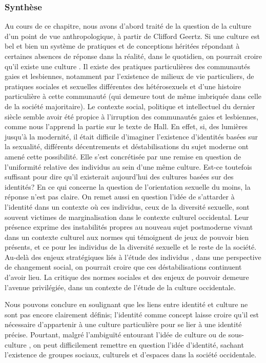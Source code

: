 \subsubsection{Synthèse}
\label{sec:synth_se}
Au cours de ce chapitre, nous avons d'abord traité de la question de la culture d'un point de vue anthropologique, à partir de Clifford Geertz.
Si une culture est bel et bien un système de pratiques et de conceptions héritées répondant à certaines absences de réponse dans la réalité, dans le quotidien, on pourrait croire qu'il existe une culture \lgbt{}.
Il existe des pratiques particulières des communautés gaies et lesbiennes, notamment par l'existence de milieux de vie particuliers, de pratiques sociales et sexuelles différentes des hétérosexuels et d'une histoire particulière à cette communauté (qui demeure tout de même imbriquée dans celle de la société majoritaire).
Le contexte social, politique et intellectuel du dernier siècle semble avoir été propice à l'irruption des communautés gaies et lesbiennes, comme nous l'apprend la partie sur le texte de Hall.
En effet, si, des lumières jusqu'à la modernité, il était difficile d'imaginer l'existence d'identités basées sur la sexualité, différents décentrements et déstabilisations du sujet moderne ont amené cette possibilité.
Elle s'est concrétisée par une remise en question de l'uniformité relative des individus au sein d'une même culture.
Est-ce toutefois suffisant pour dire qu'il existerait aujourd'hui des cultures basées sur des identités?
En ce qui concerne la question de l'orientation sexuelle du moins, la réponse n'est pas claire.
On remet aussi en question l'idée de s'attarder à l'identité dans un contexte où ces individus, ceux de la diversité sexuelle, sont souvent victimes de marginalisation dans le contexte culturel occidental.
Leur présence exprime des instabilités propres au nouveau sujet postmoderne vivant dans un contexte culturel aux normes qui témoignent de jeux de pouvoir bien présents, et ce pour les individus de la diversité sexuelle et le reste de la société.
Au-delà des enjeux stratégiques liés à l'étude des individus \lgbt{}, dans une perspective de changement social, on pourrait croire que ces déstabilisations continuent d'avoir lieu.
La critique des normes sociales et des enjeux de pouvoir demeure l'avenue privilégiée, dans un contexte de l'étude de la culture occidentale.

Nous pouvons conclure en soulignant que les liens entre identité et culture ne sont pas encore clairement définis; l'identité comme concept laisse croire qu'il est nécessaire d'appartenir à une culture particulière pour se lier à une identité précise.
Pourtant, malgré l'ambiguïté entourant l'idée de culture ou de sous-culture \lgbt{}, on peut difficilement remettre en question l'idée d'identité, sachant l'existence de groupes sociaux, culturels et d'espaces \lgbt{} dans la société occidentale.

